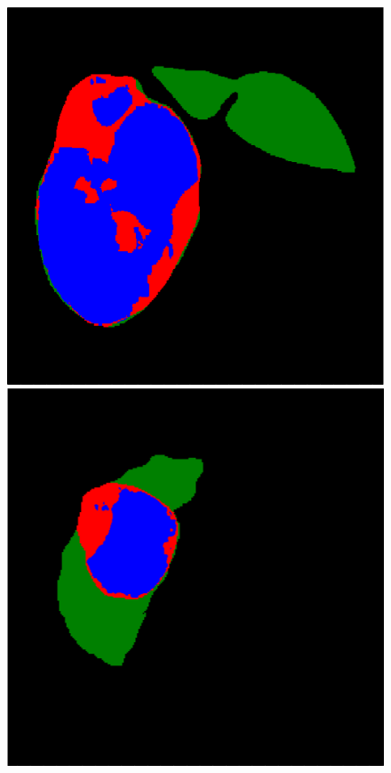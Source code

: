 \begin{figure}[!ht]
\begin{minipage}{4cm}
\end{minipage} \hspace{-0.3cm}
\begin{minipage}{4cm}
\includegraphics[width=\linewidth]{../SemanticSeg/images/5_4_gt_resized}
\end{minipage} 
\vspace{-0.2cm}
\begin{minipage}{4cm}
\includegraphics[width=\linewidth]{../SemanticSeg/images/1_7_FullAuto_new_resized}

\end{minipage}
\end{figure}

